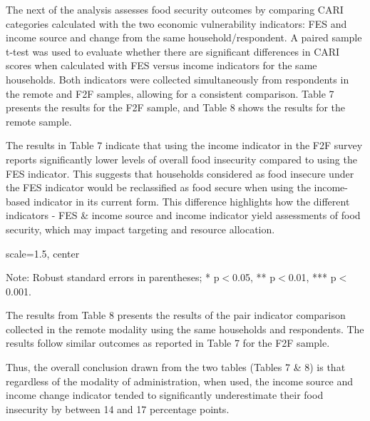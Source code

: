 \documentclass[11pt,harvard]{article}
\begin{document}
	The next of the analysis assesses food security outcomes by comparing CARI categories calculated with the two economic vulnerability indicators: FES and income source and change from the same household/respondent. A paired sample t-test was used to evaluate whether there are significant differences in CARI scores when calculated with FES versus income indicators for the same households. Both indicators were collected simultaneously from respondents in the remote and F2F samples, allowing for a consistent comparison. Table 7 presents the results for the F2F sample, and Table 8 shows the results for the remote sample.
	
	The results in Table 7 indicate that using the income indicator in the F2F survey reports significantly lower levels of overall food insecurity compared to using the FES indicator. This suggests that households considered as food insecure under the FES indicator would be reclassified as food secure when using the income-based indicator in its current form. This difference highlights how the different indicators - FES \& income source and income indicator  yield assessments of food security, which may impact targeting and resource allocation.
	
	\begin{table}[htbp]
	\centering
	\begin{adjustbox}{scale=1.5, center} %
		\begin{threeparttable}
			\caption{CARI: FES vs. Inc - Paired (F2F Surveys)}
			\footnotesize
			 
			\label{tab:BF_F2F_Paired_ttest_Full}
			\begin{tablenotes}
				\item Note: Robust standard errors in parentheses; * p$<$0.05, ** p$<$0.01, *** p$<$0.001.
			\end{tablenotes}
		\end{threeparttable}
	\end{adjustbox}
	\end{table}
	
	The results from Table 8 presents the results of the pair indicator comparison collected in the remote modality using the same households and respondents. The results follow similar outcomes as reported in Table 7 for the F2F sample. 
	
	Thus, the overall conclusion drawn from the two tables (Tables 7 \& 8) is that regardless of the modality of administration, when used, the income source and income change indicator tended to significantly underestimate their food insecurity by between 14 and 17 percentage points.
	
\end{document}
